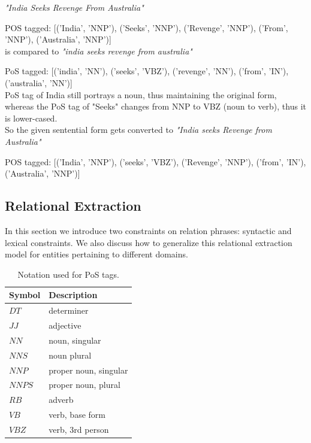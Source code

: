\documentclass{article}
\begin{document}
\textit{"India Seeks Revenge From Australia"}

POS tagged: [('India', 'NNP'), ('Seeks', 'NNP'), ('Revenge', 'NNP'), ('From', 'NNP'), ('Australia', 'NNP')]\\

is compared to \textit{"india seeks revenge from australia"}

PoS tagged: [('india', 'NN'), ('seeks', 'VBZ'), ('revenge', 'NN'), ('from', 'IN'), ('australia', 'NN')]\\

PoS tag of India still portrays a noun, thus maintaining the original form, whereas the PoS tag of "Seeks" changes from NNP to VBZ (noun to verb), thus it is lower-cased.\\

So the given sentential form gets converted to \textit{"India seeks Revenge from Australia"}

POS tagged: [('India', 'NNP'), ('seeks', 'VBZ'), ('Revenge', 'NNP'), ('from', 'IN'), ('Australia', 'NNP')]


\subsection{Relational Extraction}

In this section we introduce two constraints on relation phrases: syntactic and lexical constraints. We also discuss how to generalize this relational extraction model for entities pertaining to different domains. 

\begin{table}[h]
  \caption{Notation used for PoS tags.}
  \centering
  \begin{tabular}{|l|l|} \hline
  \label{tab:pos-notation}
  \textbf{Symbol} & \textbf{Description} \\ \hline
  $DT$   & determiner\\ \hline
  $JJ$   & adjective\\ \hline
  $NN$   & noun, singular  \\ \hline
  $NNS$   & noun plural    \\ \hline
  $NNP$   & proper noun, singular      \\ \hline
  $NNPS$   & proper noun, plural	 \\ \hline
  $RB$   & adverb    \\ \hline
  $VB$   & verb, base form    \\ \hline
  $VBZ$   & verb, 3rd person\\ \hline
  
  \end{tabular}
\end{table}
\end{document}
